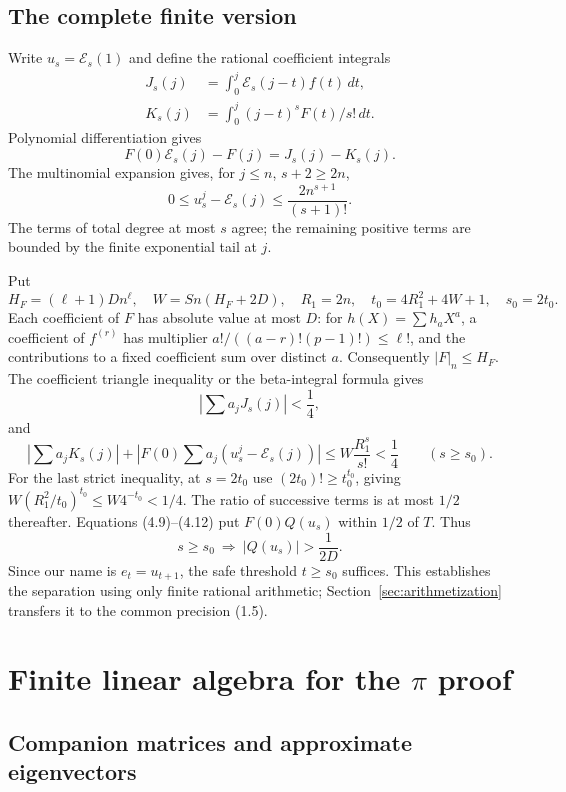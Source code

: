 \documentclass[11pt]{article}
\theoremstyle{definition}
\newcommand{\Exp}{\mathcal E}
\begin{document}
\subsection{The complete finite version}

Write \(u_s=\Exp_s(1)\) and define the rational coefficient integrals
\[
 \begin{split}
 J_s(j)&=\int_0^j \Exp_s(j-t)f(t)\,dt,\\
 K_s(j)&=\int_0^j (j-t)^sF(t)/s!\,dt.
 \end{split}
\]
Polynomial differentiation gives
\[
 F(0)\Exp_s(j)-F(j)=J_s(j)-K_s(j). \tag{4.9}
\]
The multinomial expansion gives, for \(j\le n\), \(s+2\ge2n\),
\[
 0\le u_s^j-\Exp_s(j)\le\frac{2n^{s+1}}{(s+1)!}.
 \tag{4.10}
\]
The terms of total degree at most \(s\) agree; the remaining positive
terms are bounded by the finite exponential tail at \(j\).

Put
\[
 H_F=(\ell+1)Dn^\ell,\quad W=Sn(H_F+2D),\quad R_1=2n,\quad
 t_0=4R_1^2+4W+1,\quad s_0=2t_0. \tag{4.11}
\]
Each coefficient of \(F\) has absolute value at most \(D\):
for \(h(X)=\sum h_aX^a\), a coefficient of \(f^{(r)}\)
has multiplier \(a!/((a-r)!(p-1)!)\le\ell!\), and the contributions
to a fixed coefficient sum over distinct \(a\).
Consequently \(|F|_n\le H_F\).
The coefficient triangle inequality or the beta-integral formula gives
\[
 \left|\sum a_jJ_s(j)\right|<\frac14,
\]
and
\[
 \left|\sum a_jK_s(j)\right|
 +\left|F(0)\sum a_j(u_s^j-\Exp_s(j))\right|
 \le W\frac{R_1^s}{s!}<\frac14
 \qquad(s\ge s_0). \tag{4.12}
\]
For the last strict inequality, at \(s=2t_0\) use
\((2t_0)!\ge t_0^{t_0}\), giving
\(W(R_1^2/t_0)^{t_0}\le W4^{-t_0}<1/4\).
The ratio of successive terms is at most \(1/2\) thereafter.
Equations (4.9)--(4.12) put \(F(0)Q(u_s)\) within \(1/2\)
of \(T\). Thus
\[
 s\ge s_0\ \Longrightarrow\ |Q(u_s)|>\frac1{2D}.
 \tag{4.13}
\]
Since our name is \(e_t=u_{t+1}\), the safe threshold \(t\ge s_0\)
suffices. This establishes the separation using only finite rational
arithmetic; Section~\ref{sec:arithmetization} transfers it to the common
precision (1.5).

\section{Finite linear algebra for the \texorpdfstring{\(\pi\)}{pi} proof}\label{sec:linear}

\subsection{Companion matrices and approximate eigenvectors}
\end{document}
